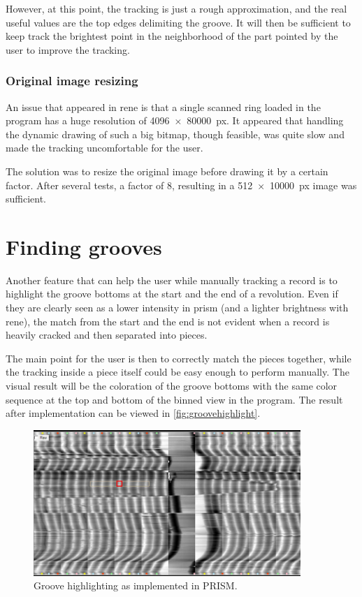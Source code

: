 However, at this point, the tracking is just a rough approximation, and the real useful values are the top edges delimiting the groove. It will then be sufficient to keep track the brightest point in the neighborhood of the part pointed by the user to improve the tracking.

\subsubsection{Original image resizing}

An issue that appeared in \gls{rene} is that a single scanned ring loaded in the program has a huge resolution of \SI[product-units=single]{4096x80000}{px}. It appeared that handling the dynamic drawing of such a big bitmap, though feasible, was quite slow and made the tracking uncomfortable for the user.

The solution was to resize the original image before drawing it by a certain factor. After several tests, a factor of 8, resulting in a \SI[product-units=single]{512x10000}{px} image was sufficient.

\section{Finding grooves}
\label{sec:groovebot}

Another feature that can help the user while manually tracking a record is to highlight the groove bottoms at the start and the end of a revolution. Even if they are clearly seen as a lower intensity in \gls{prism} (and a lighter brightness with \gls{rene}), the match from the start and the end is not evident when a record is heavily cracked and then separated into pieces.

The main point for the user is then to correctly match the pieces together, while the tracking inside a piece itself could be easy enough to perform manually. The visual result will be the coloration of the groove bottoms with the same color sequence at the top and bottom of the binned view in the program. The result after implementation can be viewed in \autoref{fig:groovehighlight}.

\begin{figure}[!ht]
\centering
\includegraphics[width=0.9\textwidth]{images/groove-highlight}
\caption{Groove highlighting as implemented in PRISM.}
\label{fig:groovehighlight}
\end{figure}

